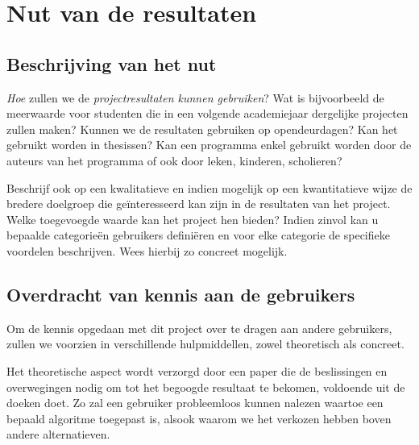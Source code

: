 \documentclass[]{book}
\begin{document}
\section{Nut van de resultaten}\label{sec:Nut}

\subsection{Beschrijving van het nut}\label{sec:BeschrijvingNut}

\emph{Hoe} zullen we de \emph{projectresultaten kunnen gebruiken}? Wat is bijvoorbeeld de meerwaarde voor studenten die in een volgende academiejaar dergelijke projecten zullen maken? Kunnen we de resultaten gebruiken op opendeurdagen? Kan het gebruikt worden in thesissen? Kan een programma enkel gebruikt worden door de auteurs van het programma of ook door leken, kinderen, scholieren?

Beschrijf  ook op een kwalitatieve en indien mogelijk op een kwantitatieve wijze de bredere doelgroep die ge\"interesseerd kan zijn in de resultaten van het project. Welke toegevoegde waarde kan het project hen bieden?  Indien zinvol kan u bepaalde categorie\"en gebruikers defini\"eren en voor elke categorie de specifieke voordelen beschrijven. Wees hierbij zo concreet mogelijk. 

\subsection{Overdracht van kennis aan de gebruikers}\label{sec:Overdracht}


Om de kennis opgedaan met dit project over te dragen aan andere gebruikers, zullen we voorzien in verschillende hulpmiddellen, zowel theoretisch als concreet.

Het theoretische aspect wordt verzorgd door een paper die de beslissingen en overwegingen nodig om tot het begoogde resultaat te bekomen, voldoende uit de doeken doet. Zo zal een gebruiker probleemloos kunnen nalezen waartoe een bepaald algoritme toegepast is, alsook waarom we het verkozen hebben boven andere alternatieven.
\end{document}
